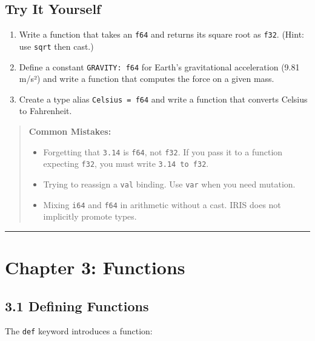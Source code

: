 \documentclass[
  english,
]{book}
\providecommand{\tightlist}{%
  \setlength{\itemsep}{0pt}\setlength{\parskip}{0pt}}
\begin{document}
\subsection{Try It Yourself}\label{try-it-yourself-1}

\begin{enumerate}
\def\labelenumi{\arabic{enumi}.}
\tightlist
\item
  Write a function that takes an \texttt{f64} and returns its square
  root as \texttt{f32}. (Hint: use \texttt{sqrt} then cast.)
\item
  Define a constant \texttt{GRAVITY:\ f64} for Earth's gravitational
  acceleration (9.81 m/s²) and write a function that computes the force
  on a given mass.
\item
  Create a type alias \texttt{Celsius\ =\ f64} and write a function that
  converts Celsius to Fahrenheit.
\end{enumerate}

\begin{quote}
\textbf{Common Mistakes:}

\begin{itemize}
\tightlist
\item
  Forgetting that \texttt{3.14} is \texttt{f64}, not \texttt{f32}. If
  you pass it to a function expecting \texttt{f32}, you must write
  \texttt{3.14\ to\ f32}.
\item
  Trying to reassign a \texttt{val} binding. Use \texttt{var} when you
  need mutation.
\item
  Mixing \texttt{i64} and \texttt{f64} in arithmetic without a cast.
  IRIS does not implicitly promote types.
\end{itemize}
\end{quote}

\begin{center}\rule{0.5\linewidth}{0.5pt}\end{center}

\section{Chapter 3: Functions}\label{chapter-3-functions}

\subsection{3.1 Defining Functions}\label{defining-functions}

The \texttt{def} keyword introduces a function:
\end{document}
